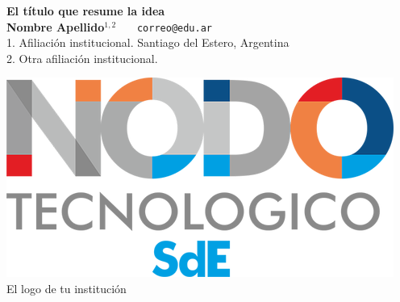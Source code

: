 \documentclass[a0,portrait]{a0poster} %
\begin{document}
\centering \fontsize{90}{90} \textbf{El título que resume la idea} \\[0.5cm]  %
\LARGE \textbf{Nombre Apellido}$^{1,2}$  \ \ \  \texttt{correo@edu.ar} \\
\large 1. Afiliación institucional. Santiago del Estero, Argentina \\
\large 2. Otra afiliación institucional.\\


\vspace{1cm}

\includegraphics[width=0.2\linewidth]{figuras/NODOSdE.png} \\
\fontsize{55}{55}\selectfont El logo de tu institución \\[0.3cm]
\end{document}
